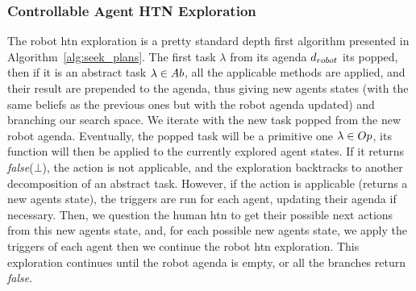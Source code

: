 \documentclass[a4paper,11pt,twoside]{StyleThese}
\begin{document}
\subsubsection{Controllable Agent HTN Exploration}
The robot \acrshort{htn} exploration is a pretty standard depth first algorithm presented in Algorithm~\ref{alg:seek_plans}. The first task $\lambda$ from its agenda $d_{robot}$ its popped, then if it is an abstract task $\lambda \in Ab$, all the applicable methods are applied, and their result are prepended to the agenda, thus giving new agents states (with the same beliefs as the previous ones but with the robot agenda updated) and branching our search space. We iterate with the new task popped from the new robot agenda. Eventually, the popped task will be a primitive one $\lambda \in Op$, its function will then be applied to the currently explored agent states. If it returns \textit{false}($\bot$), the action is not applicable, and the exploration backtracks to another decomposition of an abstract task. However, if the action is applicable (returns a new agents state), the triggers are run for each agent, updating their agenda if necessary. Then, we question the human \acrshort{htn} to get their possible next actions from this new agents state, and, for each possible new agents state, we apply the triggers of each agent then we continue the robot \acrshort{htn} exploration. This exploration continues until the robot agenda is empty, or all the branches return \textit{false}.
\end{document}
